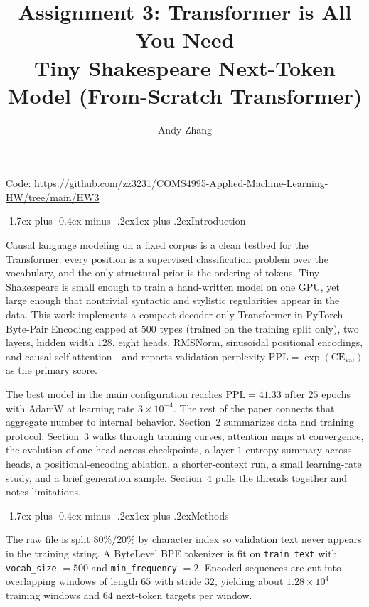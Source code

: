 \documentclass[10pt]{article}
\title{Assignment 3: Transformer is All You Need\\
{\large Tiny Shakespeare Next-Token Model (From-Scratch Transformer)}}
\author{Andy Zhang}
\date{}
\makeatletter
\renewcommand\section{\@startsection{section}{1}{\z@}%
  {-1.7ex plus -0.4ex minus -.2ex}{1ex plus .2ex}{\normalfont\Large\bfseries}}
\makeatother
\begin{document}
\maketitle
\vspace{-1em}

\noindent Code: \url{https://github.com/zz3231/COMS4995-Applied-Machine-Learning-HW/tree/main/HW3}

\section{Introduction}

Causal language modeling on a fixed corpus is a clean testbed for the Transformer: every position is a supervised classification problem over the vocabulary, and the only structural prior is the ordering of tokens. Tiny Shakespeare is small enough to train a hand-written model on one GPU, yet large enough that nontrivial syntactic and stylistic regularities appear in the data. This work implements a compact decoder-only Transformer in PyTorch---Byte-Pair Encoding capped at $500$ types (trained on the training split only), two layers, hidden width $128$, eight heads, RMSNorm, sinusoidal positional encodings, and causal self-attention---and reports validation perplexity $\mathrm{PPL} = \exp(\mathrm{CE}_{\mathrm{val}})$ as the primary score.

The best model in the main configuration reaches $\mathrm{PPL} = 41.33$ after $25$ epochs with AdamW at learning rate $3 \times 10^{-4}$. The rest of the paper connects that aggregate number to internal behavior. Section~2 summarizes data and training protocol. Section~3 walks through training curves, attention maps at convergence, the evolution of one head across checkpoints, a layer-$1$ entropy summary across heads, a positional-encoding ablation, a shorter-context run, a small learning-rate study, and a brief generation sample. Section~4 pulls the threads together and notes limitations.

\section{Methods}

The raw file is split $80\%/20\%$ by character index so validation text never appears in the training string. A ByteLevel BPE tokenizer is fit on \texttt{train\_text} with \texttt{vocab\_size} $= 500$ and \texttt{min\_frequency} $= 2$. Encoded sequences are cut into overlapping windows of length $65$ with stride $32$, yielding about $1.28 \times 10^4$ training windows and $64$ next-token targets per window.
\end{document}

